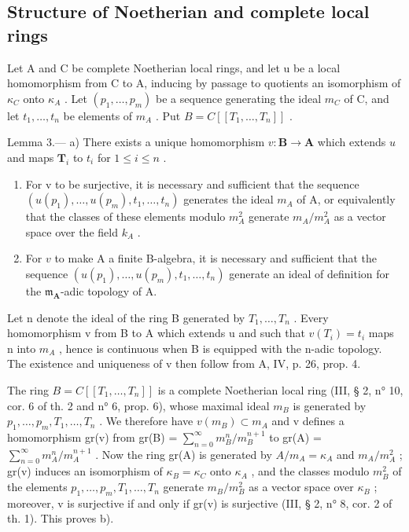 \subsection{Structure of Noetherian and complete local rings}

Let A and C be complete Noetherian local rings, and let u be a local homomorphism from C to A, inducing by passage to quotients an isomorphism of \(\kappa_{C}\) onto \(\kappa_{A}\) . Let \((p_{1}, \ldots, p_{m})\) be a sequence generating the ideal \(m_{C}\) of C, and let \(t_{1}, \ldots, t_{n}\) be elements of \(m_{A}\) . Put \(B = C[[T_{1}, \ldots, T_{n}]]\) .

Lemma 3.--- a) There exists a unique homomorphism \(v: \mathbf{B} \to \mathbf{A}\) which extends \(u\) and maps \(\mathbf{T}_i\) to \(t_i\) for \(1 \leqslant i \leqslant n\) .

\begin{enumerate}
\def\labelenumi{\alph{enumi})}
\setcounter{enumi}{1}
\item
  For v to be surjective, it is necessary and sufficient that the sequence \((u(p_{1}), \ldots, u(p_{m}), t_{1}, \ldots, t_{n})\) generates the ideal \(m_{A}\) of A, or equivalently that the classes of these elements modulo \(m_{A}^{2}\) generate \(m_{A}/m_{A}^{2}\) as a vector space over the field \(k_{A}\) .
\item
  For \(v\) to make A a finite B-algebra, it is necessary and sufficient that the sequence \((u(p_1), \ldots, u(p_m), t_1, \ldots, t_n)\) generate an ideal of definition for the \(\mathfrak{m}_{\mathbf{A}}\)-adic topology of A.
\end{enumerate}

Let n denote the ideal of the ring B generated by \(T_{1}, \ldots, T_{n}\) . Every homomorphism v from B to A which extends u and such that \(v(T_{i}) = t_{i}\) maps n into \(m_{A}\) , hence is continuous when B is equipped with the n-adic topology. The existence and uniqueness of v then follow from A, IV, p. 26, prop. 4.

The ring \(B = C[[T_{1}, \ldots, T_{n}]]\) is a complete Noetherian local ring (III, § 2, n° 10, cor. 6 of th. 2 and n° 6, prop. 6), whose maximal ideal \(m_{B}\) is generated by \(p_{1}, \ldots, p_{m}, T_{1}, \ldots, T_{n}\) . We therefore have \(v(m_{B}) \subset m_{A}\) and v defines a homomorphism gr(v) from gr(B) = \(\sum_{n=0}^{\infty} m_{B}^{n}/m_{B}^{n+1}\) to gr(A) = \(\sum_{n=0}^{\infty} m_{A}^{n}/m_{A}^{n+1}\) . Now the ring gr(A) is generated by \(A/m_{A} = \kappa_{A}\) and \(m_{A}/m_{A}^{2}\) ; gr(v) induces an isomorphism of \(\kappa_{B} = \kappa_{C}\) onto \(\kappa_{A}\) , and the classes modulo \(m_{B}^{2}\) of the elements \(p_{1}, \ldots, p_{m}, T_{1}, \ldots, T_{n}\) generate \(m_{B}/m_{B}^{2}\) as a vector space over \(\kappa_{B}\) ; moreover, v is surjective if and only if gr(v) is surjective (III, § 2, n° 8, cor. 2 of th. 1). This proves b).

